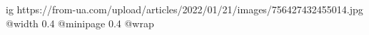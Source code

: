  
 
 
 
 

\ifcmt
  ig https://from-ua.com/upload/articles/2022/01/21/images/756427432455014.jpg
  @width 0.4
  @minipage 0.4
  @wrap \parpic[l]
\fi
